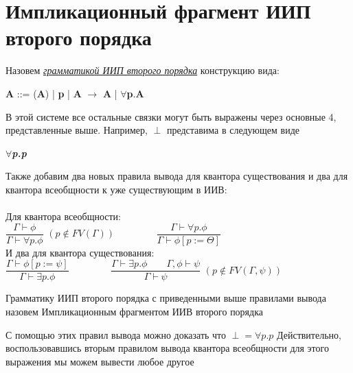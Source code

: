 	\section{Импликационный фрагмент ИИП второго порядка}
 	\begin{center}
 		\begin{definition}
 			\large Назовем \textit{\underline{грамматикой ИИП второго порядка}} конструкцию вида: 
 		\end{definition}
 	\textbf{A} ::= 
 	(\textbf{A}) |
 	\textbf{p} |
 	\textbf{A} $\rightarrow$ \textbf{A} |
 	$\forall$\textbf{p}.\textbf{A} 
 	
 	\end{center}
 
 	\large В этой системе все остальные связки могут быть выражены через основные 4, представленные выше. Например, $\perp$ представима в следующем виде
 	\begin{center}
 		{\textbf{\textsl\textit{\large $\forall$p.p}}} \\
 	\end{center}
 	
 	
 	 Также добавим два новых правила вывода дл\textsl{}я квантора существования и два для квантора всеобщности к уже существующим в ИИВ: \\ \\
 	
	Для квантора всеобщности: \\ 
 	
 	\Large{$\dfrac{\Gamma\vdash\phi}{\Gamma\vdash\forall p.\phi}$} \Large$(p\notin FV(\Gamma)) \qquad\qquad$ 
 	\Large{$\dfrac{\Gamma\vdash\forall p.\phi}{\Gamma\vdash\phi[p:=\Theta]}$}	\\
 	
 	 И два для квантора существования: \\
 	
 	\Large{$\dfrac{\Gamma\vdash\phi[p:= \psi]}{\Gamma\vdash\exists p.\phi}\qquad\qquad$} 
 	\Large{$\dfrac{\Gamma\vdash\exists p.\phi\qquad\Gamma, \phi\vdash\psi}{\Gamma\vdash\psi}$} \Large$(p\notin FV(\Gamma, \psi))$ \\ 
 	
 	
 	\begin{definition}
 		\large Грамматику ИИП второго порядка с приведенными выше правилами вывода назовем Импликационным фрагментом ИИВ второго порядка\\ 
 	\end{definition}
 	\large {С помощью этих правил вывода можно доказать что \textbf{${\perp = \forall p.p}$}
 		Действительно, воспользовавшись вторым правилом вывода квантора всеобщности для этого выражения мы можем вывести любое другое}
 	

